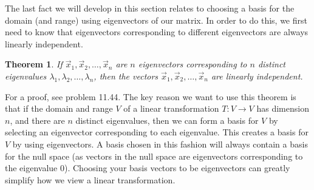\documentclass[10pt]{article}
\theoremstyle{plain}
\newtheorem{theorem}{Theorem}\newtheorem*{theorem*}{Theorem}
\theoremstyle{box}
\begin{document}
The last fact we will develop in this section relates to choosing a basis for the domain (and range) using eigenvectors of our matrix.  In order to do this, we first need to know that eigenvectors corresponding to different eigenvectors are always linearly independent.
\begin{theorem}
If $\vec x_1,\vec x_2,\ldots,\vec x_n$ are $n$ eigenvectors corresponding to $n$ distinct eigenvalues $\lambda_1, \lambda_2,\ldots, \lambda_n$, then the vectors $\vec x_1,\vec x_2,\ldots,\vec x_n$ are linearly independent.
\end{theorem}
For a proof, see problem 11.44. The key reason we want to use this theorem is that if the domain and range $V$ of a linear transformation $T:V\to V$ has dimension $n$, and there are $n$ distinct eigenvalues, then we can form a basis for $V$ by selecting an eigenvector corresponding to each eigenvalue. This creates a basis for $V$ by using eigenvectors. A basis chosen in this fashion will always contain a basis for the null space (as vectors in the null space are eigenvectors corresponding to the eigenvalue 0). Choosing your basis vectors to be eigenvectors can greatly simplify how we view a linear transformation.  
 
\end{document}

